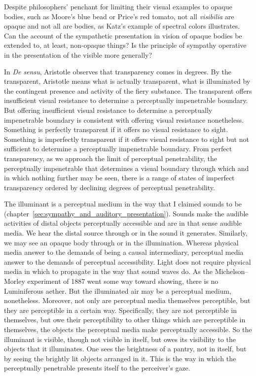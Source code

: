 Despite philosophers' penchant for limiting their visual examples to opaque bodies, such as Moore's \citeyearpar{Moore:1903uo} blue bead or Price's \citeyearpar{Price:1932fk} red tomato, not all \emph{visibilia} are opaque and not all are bodies, as Katz's example of spectral colors illustrates. Can the account of the sympathetic presentation in vision of opaque bodies be extended to, at least, non-opaque things? Is the principle of sympathy operative in the presentation of the visible more generally?

In \emph{De sensu}, Aristotle observes that transparency comes in degrees. By the transparent, Aristotle means what is actually transparent, what is illuminated by the contingent presence and activity of the fiery substance. The transparent offers insufficient visual resistance to determine a perceptually impenetrable boundary. But offering insufficient visual resistance to determine a perceptually impenetrable boundary is consistent with offering visual resistance nonetheless. Something is perfectly transparent if it offers no visual resistance to sight. Something is imperfectly transparent if it offers visual resistance to sight but not sufficient to determine a perceptually impenetrable boundary. From perfect transparency, as we approach the limit of perceptual penetrability, the perceptually impenetrable that determines a visual boundary through which and in which nothing further may be seen, there is a range of states of imperfect transparency ordered by declining degrees of perceptual penetrability. 

The illuminant is a perceptual medium in the way that I claimed sounds to be (chapter~\ref{sec:sympathy_and_auditory_presentation}). Sounds make the audible activities of distal objects perceptually accessible and are in that sense audible media. We hear the distal source through or in the sound it generates. Similarly, we may see an opaque body through or in the illumination. Whereas physical media answer to the demands of being a causal intermediary, perceptual media answer to the demands of perceptual accessibility. Light does not require physical media in which to propagate in the way that sound waves do. As the Michelson–Morley experiment of 1887 went some way toward showing, there is no Luminiferous aether. But the illuminated air may be a perceptual medium, nonetheless. Moreover, not only are perceptual media themselves perceptible, but they are perceptible in a certain way. Specifically, they are not perceptible in themselves, but owe their perceptibility to other things which are perceptible in themselves, the objects the perceptual media make perceptually accessible. So the illuminant is visible, though not visible in itself, but owes its visibility to the objects that it illuminates. One sees the brightness of a pantry, not in itself, but by seeing the brightly lit objects arranged in it. This is the way in which the perceptually penetrable presents itself to the perceiver's gaze.

